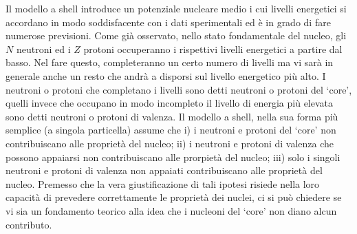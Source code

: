 Il modello a shell introduce un potenziale nucleare medio i cui livelli energetici si accordano in modo soddisfacente con i dati sperimentali ed è in grado di fare numerose previsioni.
Come già osservato, nello stato fondamentale del nucleo, gli $N$ neutroni ed i $Z$ protoni occuperanno i rispettivi livelli energetici a partire dal basso. Nel fare questo, completeranno un certo numero di livelli ma vi sarà in generale anche un resto che andrà a disporsi sul livello energetico più alto. I neutroni o protoni che completano i livelli sono detti neutroni o protoni del ‘core’, quelli invece che occupano in modo incompleto il livello di energia più elevata sono detti neutroni o protoni di valenza.
Il modello a shell, nella sua forma più semplice (a singola particella) assume che
i) i neutroni e protoni del ‘core’ non contribuiscano alle proprietà del nucleo;
ii) i neutroni e protoni di valenza che possono appaiarsi non contribuiscano alle prorpietà del nucleo;
iii) solo i singoli neutroni e protoni di valenza non appaiati contribuiscano alle proprietà del nucleo.
Premesso che la vera giustificazione di tali ipotesi risiede nella loro capacità di prevedere correttamente le proprietà dei nuclei, ci si può chiedere se vi sia un fondamento teorico alla idea che i nucleoni del ‘core’ non diano alcun contributo.

